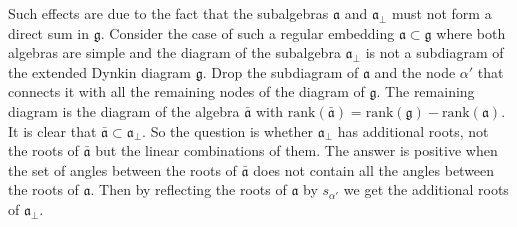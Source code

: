 \documentclass[12pt]{iopart}
\begin{document}
Such effects are due to the fact that the subalgebras $\mathfrak{a}$ and $\mathfrak{a}_{\bot}$ must not form a direct sum in $\mathfrak{g}$.  
Consider the case of such a regular embedding $\mathfrak{a}\subset \mathfrak{g}$ where both algebras are simple and the diagram of the subalgebra $\mathfrak{a}_{\bot}$ is not a subdiagram of the extended Dynkin diagram $\mathfrak{g}$.
 Drop the subdiagram of $\mathfrak{a}$ and the node $\alpha'$ that connects it with all the remaining nodes of the diagram of $\mathfrak{g}$. The remaining diagram is the diagram of the algebra $\mathfrak{\bar{a}}$ with $\mathrm{rank}(\mathfrak{\bar{a}}) = \mathrm{rank}(\mathfrak{g})-\mathrm{rank}(\mathfrak{a})$. It is clear that $\mathfrak{\bar{a}}\subset \mathfrak{a}_{\bot}$. So the question is whether $\mathfrak{a}_{\bot}$ has additional roots,  not the roots of $\mathfrak{\bar{a}}$ but the linear combinations of them. The answer is positive  when the set of angles between the roots of $\mathfrak{\bar{a}}$ does not contain all the angles between the roots of $\mathfrak{a}$. Then by reflecting the roots of $\mathfrak{a}$ by $s_{\alpha'}$ we get the additional roots of $\mathfrak{a}_{\bot}$. 
\end{document}
